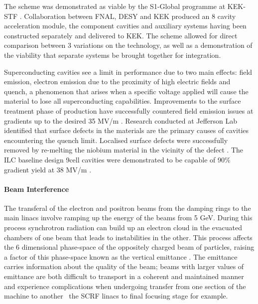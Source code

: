 The scheme was demonstrated as viable by the S1-Global programme at KEK-STF \cite{IPAC:S1Module}. Collaboration between FNAL, DESY and KEK produced an 8 cavity acceleration module, the component cavities and auxiliary systems having been constructed separately and delivered to KEK. The scheme allowed for direct comparison between 3 variations on the technology, as well as a demonstration of the viability that separate systems be brought together for integration.

Superconducting cavities see a limit in performance due to two main effects: field emission, electron emission due to the proximity of high electric fields and quench, a phenomenon that arises when a specific voltage applied will cause the material to lose all superconducting capabilities. Improvements to the surface treatment phase of production have successfully countered field emission issues at gradients up to the desired 35 MV/m \cite{ILC:TechnicalDesignReport}. Research conducted at Jefferson Lab identified that surface defects in the materials are the primary causes of cavities encountering the quench limit. Localised surface defects were successfully removed by re-melting the niobium material in the vicinity of the defect \cite{SRF:Gradient}. The ILC baseline design 9\textendash cell cavities were demonstrated to be capable of 90\% gradient yield at 38 MV/m \cite{IPAC:SRFGradient}.  

\paragraph{Beam Interference}

The transferal of the electron and positron beams from the damping rings to the main linacs involve ramping up the energy of the beams from 5 GeV. During this process synchrotron radiation can build up an electron cloud in the evacuated chambers of one beam that leads to instabilities in the other. This process affects the 6 dimensional phase-space of the oppositely charged beam of particles, raising a factor of this phase-space known as the vertical emittance \cite{SSolutions:BeamEmittance}. The emittance carries information about the quality of the beam; beams with larger values of emittance are both difficult to transport in a coherent and maintained manner and experience complications when undergoing transfer from one section of the machine to another \textemdash \, the SCRF linacs to final focusing stage for example.

